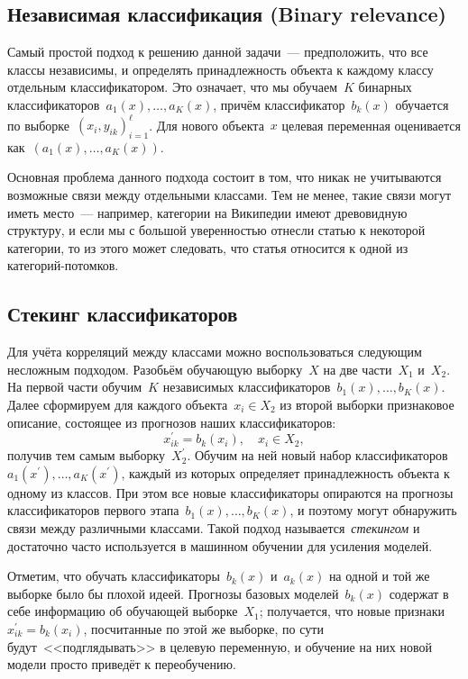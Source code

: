 \documentclass[12pt,fleqn]{article}
\begin{document}
\subsection{Независимая классификация (Binary relevance)}

Самый простой подход к решению данной задачи~--- предположить, что все классы независимы,
и определять принадлежность объекта к каждому классу отдельным классификатором.
Это означает, что мы обучаем~$K$ бинарных классификаторов~$a_1(x), \dots, a_K(x)$,
причём классификатор~$b_k(x)$ обучается по выборке~$(x_i, y_{ik})_{i = 1}^{\ell}$.
Для нового объекта~$x$ целевая переменная оценивается как~$(a_1(x), \dots, a_K(x))$.

Основная проблема данного подхода состоит в том, что никак не учитываются возможные
связи между отдельными классами.
Тем не менее, такие связи могут иметь место~--- например, категории на Википедии имеют древовидную структуру,
и если мы с большой уверенностью отнесли статью к некоторой категории, то из этого может следовать,
что статья относится к одной из категорий-потомков.

\subsection{Стекинг классификаторов}

Для учёта корреляций между классами можно воспользоваться следующим несложным подходом.
Разобьём обучающую выборку~$X$ на две части~$X_1$ и~$X_2$.
На первой части обучим~$K$ независимых классификаторов~$b_1(x), \dots, b_K(x)$.
Далее сформируем для каждого объекта~$x_i \in X_2$ из второй выборки признаковое описание,
состоящее из прогнозов наших классификаторов:
\[
    x_{ik}^\prime
    =
    b_k(x_i),
    \quad
    x_i \in X_2,
\]
получив тем самым выборку~$X_2^\prime$.
Обучим на ней новый набор классификаторов~$a_1(x^\prime), \dots, a_K(x^\prime)$,
каждый из которых определяет принадлежность объекта к одному из классов.
При этом все новые классификаторы опираются на прогнозы классификаторов
первого этапа~$b_1(x), \dots, b_K(x)$,
и поэтому могут обнаружить связи между различными классами.
Такой подход называется~\emph{стекингом}
и достаточно часто используется в машинном обучении для усиления моделей.

Отметим, что обучать классификаторы~$b_k(x)$ и~$a_k(x)$ на одной и той же выборке было бы плохой идеей.
Прогнозы базовых моделей~$b_k(x)$ содержат в себе информацию об обучающей выборке~$X_1$;
получается, что новые признаки~$x_{ik}^\prime = b_k(x_i)$, посчитанные по этой же выборке, по сути будут~<<подглядывать>>
в целевую переменную, и обучение на них новой модели просто приведёт к переобучению.
\end{document}
